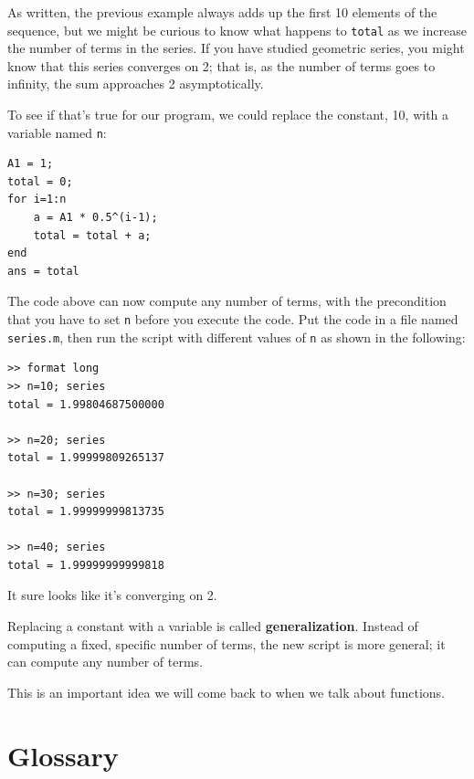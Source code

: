 \documentclass[
]{book}
\begin{document}
As written, the previous example always adds up the first 10
elements of the sequence, but we might be curious to know what
happens to {\tt total} as we increase the
number of terms in the series.  If you have studied geometric
series, you might know that this series converges on 2; that is,
as the number of terms goes to infinity, the sum approaches
2 asymptotically.

To see if that's true for our program, we could replace the
constant, 10, with a variable named {\tt n}:

\begin{verbatim}
A1 = 1;
total = 0;
for i=1:n
    a = A1 * 0.5^(i-1);
    total = total + a;
end
ans = total
\end{verbatim}

The code above can now compute any number of terms, with the
precondition that you have to set {\tt n} before you execute
the code.  Put the code in a file named {\tt series.m}, then
run the script with different values
of {\tt n}
as shown in the following:

\begin{verbatim}
>> format long
>> n=10; series
total = 1.99804687500000

>> n=20; series
total = 1.99999809265137

>> n=30; series
total = 1.99999999813735

>> n=40; series
total = 1.99999999999818
\end{verbatim}

It sure looks like it's converging on 2.

Replacing a constant with a variable is called {\bf generalization}.
Instead of computing a fixed, specific number of terms, the new script
is more general; it can compute any number of terms.

This is an important idea we will come back to when we
talk about functions.


\section{Glossary}
\end{document}
